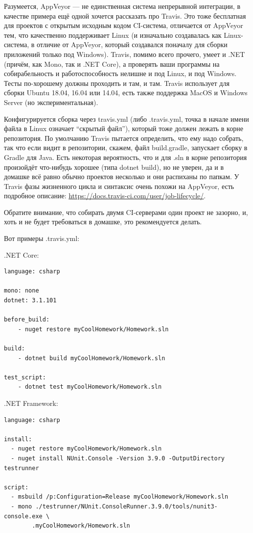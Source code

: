 \documentclass[a5paper]{article}
\begin{document}
Разумеется, AppVeyor --- не единственная система непрерывной интеграции, в качестве примера ещё одной хочется рассказать про Travis. Это тоже бесплатная для проектов с открытым исходным кодом CI-система, отличается от AppVeyor тем, что качественно поддерживает Linux (и изначально создавалась как Linux-система, в отличие от AppVeyor, который создавался поначалу для сборки приложений только под Windows). Travis, помимо всего прочего, умеет и .NET (причём, как Mono, так и .NET Core), а проверять ваши программы на собирабельность и работоспособность нелишне и под Linux, и под Windows. Тесты по-хорошему должны проходить и там, и там. Travis использует для сборки Ubuntu 18.04, 16.04 или 14.04, есть также поддержка MacOS и Windows Server (но экспериментальная).

Конфигурируется сборка через travis.yml (либо .travis.yml, точка в начале имени файла в Linux означает ``скрытый файл''), который тоже должен лежать в корне репозитория. По умолчанию Travis пытается определить, что ему надо собрать, так что если видит в репозитории, скажем, файл build.gradle, запускает сборку в Gradle для Java. Есть некоторая вероятность, что и для .sln в корне репозитория произойдёт что-нибудь хорошее (типа dotnet build), но не уверен, да и в домашке всё равно обычно проектов несколько и они распиханы по папкам. У Travis фазы жизненного цикла и синтаксис очень похожи на AppVeyor, есть подробное описание: \url{https://docs.travis-ci.com/user/job-lifecycle/}.

Обратите внимание, что собирать двумя CI-серверами один проект не зазорно, и, хоть и не будет требоваться в домашке, это рекомендуется делать. 

Вот примеры .travis.yml:

.NET Core:

\begin{verbatim}
language: csharp

mono: none
dotnet: 3.1.101

before_build: 
    - nuget restore myCoolHomework/Homework.sln

build: 
    - dotnet build myCoolHomework/Homework.sln

test_script: 
    - dotnet test myCoolHomework/Homework.sln
\end{verbatim}

.NET Framework:

\begin{verbatim}
language: csharp

install:
  - nuget restore myCoolHomework/Homework.sln
  - nuget install NUnit.Console -Version 3.9.0 -OutputDirectory testrunner

script:
  - msbuild /p:Configuration=Release myCoolHomework/Homework.sln
  - mono ./testrunner/NUnit.ConsoleRunner.3.9.0/tools/nunit3-console.exe \
        .myCoolHomework/Homework.sln
\end{verbatim}
\end{document}
